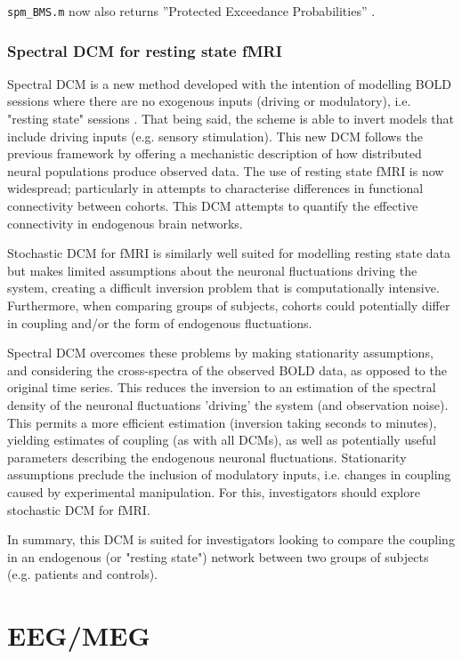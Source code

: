 \documentclass[a4paper,titlepage,openany]{article}
\begin{document}
\texttt{spm\_BMS.m} now also returns ''Protected Exceedance Probabilities'' \cite{Rigoux2014}.

\subsubsection{Spectral DCM for resting state fMRI}

Spectral DCM is a new method developed with the intention of modelling BOLD sessions where there are no exogenous inputs (driving or modulatory), i.e. "resting state" sessions \cite{rsDCM2014}. That being said, the scheme is able to invert models that include driving inputs (e.g. sensory stimulation). This new DCM follows the previous framework by offering a mechanistic description of how distributed neural populations produce observed data. The use of resting state fMRI is now widespread; particularly in attempts to characterise differences in functional connectivity between cohorts. This DCM attempts to quantify the effective connectivity in endogenous brain networks.

Stochastic DCM for fMRI is similarly well suited for modelling resting state data but makes limited assumptions about the neuronal fluctuations driving the system, creating a difficult inversion problem that is computationally intensive. Furthermore, when comparing groups of subjects, cohorts could potentially differ in coupling and/or the form of endogenous fluctuations.

Spectral DCM overcomes these problems by making stationarity assumptions, and considering the cross-spectra of the observed BOLD data, as opposed to the original time series. This reduces the inversion to an estimation of the spectral density of the neuronal fluctuations 'driving' the system (and observation noise). This permits a more efficient estimation (inversion taking seconds to minutes), yielding estimates of coupling (as with all DCMs), as well as potentially useful parameters describing the endogenous neuronal fluctuations. Stationarity assumptions preclude the inclusion of modulatory inputs, i.e. changes in coupling caused by experimental manipulation. For this, investigators should explore stochastic DCM for fMRI.

In summary, this DCM is suited for investigators looking to compare the coupling in an endogenous (or "resting state") network between two groups of subjects (e.g. patients and controls).

\section{EEG/MEG}
\end{document}
